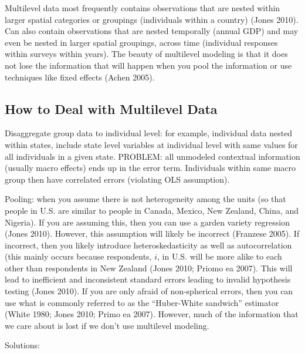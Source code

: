 \documentclass[]{book}
\begin{document}
Multilevel data most frequently contains observations that are nested
within larger spatial categories or groupings (individuals within a
country) (Jones 2010). Can also contain observations that are nested
temporally (annual GDP) and may even be nested in larger spatial
groupings, across time (individual responses within surveys within
years). The beauty of multilevel modeling is that it does not lose the
information that will happen when you pool the information or use
techniques like fixed effects (Achen 2005).

\subsection{How to Deal with Multilevel
Data}\label{how-to-deal-with-multilevel-data}

Disaggregate group data to individual level: for example, individual
data nested within states, include state level variables at individual
level with same values for all individuals in a given state. PROBLEM:
all unmodeled contextual information (usually macro effects) ends up in
the error term. Individuals within same macro group then have correlated
errors (violating OLS assumption).

Pooling: when you assume there is not heterogeneity among the units (so
that people in U.S. are similar to people in Canada, Mexico, New
Zealand, China, and Nigeria). If you are assuming this, then you can use
a garden variety regression (Jones 2010). However, this assumption will
likely be incorrect (Franzese 2005). If incorrect, then you likely
introduce heteroskedasticity as well as autocorrelation (this mainly
occurs because respondents, \(i\), in U.S. will be more alike to each
other than respondents in New Zealand (Jones 2010; Priomo ea 2007). This
will lead to inefficient and inconsistent standard errors leading to
invalid hypothesis testing (Jones 2010). If you are only afraid of
non-spherical errors, then you can use what is commonly referred to as
the ``Huber-White sandwich'' estimator (White 1980; Jones 2010; Primo ea
2007). However, much of the information that we care about is lost if we
don't use multilevel modeling.

Solutions:
\end{document}
